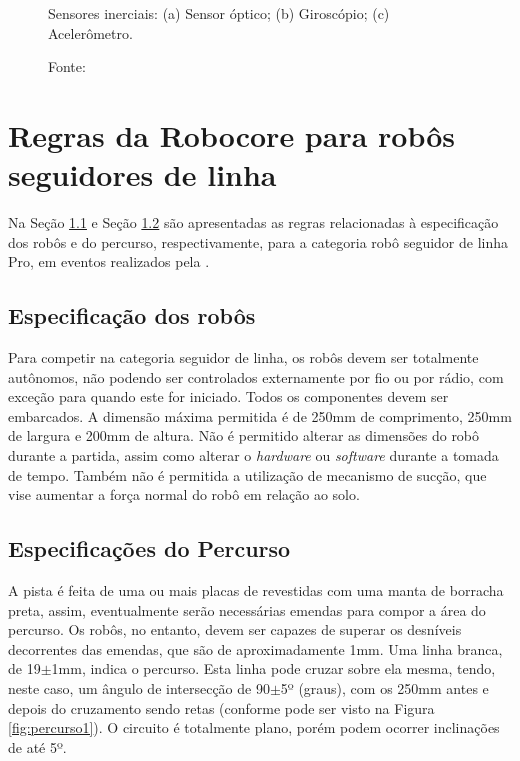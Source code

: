 \begin{figure}[h]
\begin{subfigure}[b]{0.4\textwidth}
        \caption{\centering \label{fig:acel}}
    \end{subfigure}
    \caption{\label{fig:Malhas} Sensores inerciais: (a) Sensor óptico; (b) Giroscópio; (c) Acelerômetro.}
    \vspace{-0.3cm}
    \caption*{Fonte: \cite{controle}}
\end{figure}




\vspace{1cm}
\section{Regras da Robocore para robôs seguidores de linha} \label{cap:regras_comp}

Na Seção \ref{cap:espc_robocore} e Seção \ref{cap:perc_robocore} são apresentadas as regras relacionadas à 
especificação dos robôs e do percurso, respectivamente, 
para a categoria robô seguidor de linha Pro, em eventos realizados pela .

\vspace{1cm}
\subsection{Especificação dos robôs} \label{cap:espc_robocore}

Para competir na categoria seguidor de linha, os robôs devem ser totalmente autônomos, não podendo ser controlados 
externamente por fio ou por rádio, com exceção para quando este for iniciado. Todos os componentes devem ser embarcados. A 
dimensão máxima permitida é de 250mm   de   comprimento,   250mm   de   largura   e   200mm   de   altura. Não é 
permitido alterar as dimensões do robô durante a partida, assim como alterar o \textit{hardware} ou \textit{software} 
durante a tomada de tempo. Também não é permitida a utilização de mecanismo de sucção, 
que vise aumentar a força normal do robô em relação ao solo.

\vspace{1cm}
\subsection{Especificações do Percurso} \label{cap:perc_robocore}

A pista é feita de uma ou mais placas de  revestidas com uma manta de 
borracha preta, assim, eventualmente serão necessárias emendas para compor a área do percurso. Os robôs, no entanto, 
devem ser capazes de superar os desníveis decorrentes das emendas, que são de aproximadamente 1mm.
Uma linha branca, de 19$\pm$1mm, indica o percurso. Esta linha pode cruzar sobre ela mesma, tendo, neste caso, 
um ângulo de intersecção de 90$\pm$5º (graus), com os 250mm antes e depois do cruzamento sendo retas (conforme pode 
ser visto na Figura \ref{fig:percurso1}). O circuito é totalmente plano, porém podem ocorrer 
inclinações de até 5º.\par



